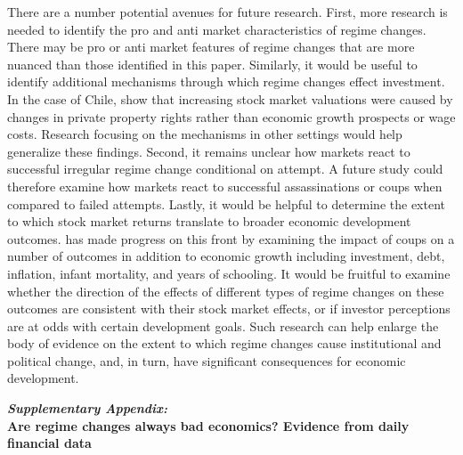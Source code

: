 \documentclass[12pt,final,fleqn]{article}
\theoremstyle{plain}
\begin{document}
There are a number potential avenues for future research. First, more research is needed to identify the pro and anti market characteristics of regime changes. There may be pro or anti market features of regime changes that are more nuanced than those identified in this paper. Similarly, it would be useful to identify additional mechanisms through which regime changes effect investment. In the case of Chile,  \citet{girardi2018institution} show that increasing stock market valuations were caused by changes in private property rights rather than economic growth prospects or wage costs. Research focusing on the mechanisms in other settings would help generalize these findings. Second, it remains unclear how markets react to successful irregular regime change conditional on attempt. A future study could therefore examine how markets react to successful assassinations or coups when compared to failed attempts. Lastly, it would be helpful to determine the extent to which stock market returns translate to broader economic development outcomes. \citet{meyersson2016political} has made progress on this front by examining the impact of coups on a number of outcomes in addition to economic growth including investment, debt, inflation, infant mortality, and years of schooling. It would be fruitful to examine whether the direction of the effects of different types of regime changes on these outcomes are consistent with their stock market effects, or if investor perceptions are at odds with certain development goals. Such research can help enlarge the body of evidence on the extent to which regime changes cause institutional and political change, and, in turn, have significant consequences for economic development.

\newpage





\newpage
\appendix
\setcounter{secnumdepth}{1}
\setcounter{table}{0}
\setcounter{figure}{0}
\renewcommand\thetable{\Alph{section}.\arabic{table}}
\renewcommand\thefigure{\Alph{section}.\arabic{figure}}

\newpage

\begin{centering}
\LARGE
\textbf{\textit{Supplementary Appendix:}} \\
 \vspace{0.5cm}
\textbf{Are regime changes always bad economics? Evidence from daily financial data} \\

\vspace{0.5cm}

\large
 
\end{centering}
\end{document}
